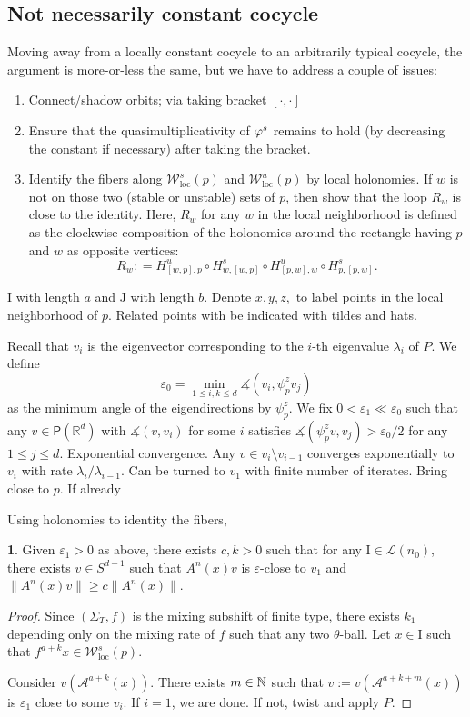 \documentclass[11pt,oneside,reqno]{amsart}
\numberwithin{equation}{section}
\numberwithin{figure}{section}
\theoremstyle{definition}
\theoremstyle{definition}
\theoremstyle{definition}
\theoremstyle{definition}
\newtheorem{lem}[thm]{\protect\lemmaname}
\theoremstyle{remark}
\theoremstyle{definition}
\theoremstyle{definition}
\theoremstyle{definition}
\def\A{\mathcal{A}}
\def\L{\mathcal{L}}
\def\P{\mathsf{P}}
\def\R{\mathbb{R}}
\def\I{\mathrm{I}}
\def\J{\mathrm{J}}
\def\PR{\P(\R^d)}
\def\vps{\vphi^s}
\def\ep{\varepsilon}
\def\mangle{\measuredangle}
\newcommand{\Wloc}{\mathcal{W}_{\text{loc}}}
\newcommand{\Sig}{\Sigma_T}
\providecommand{\lemmaname}{Lemma}
\begin{document}
\subsection{Not necessarily constant cocycle}
Moving away from a locally constant cocycle to an arbitrarily typical cocycle, the argument is more-or-less the same, but we have to address a couple of issues:
\begin{enumerate}
\item Connect/shadow orbits; via taking bracket $[\cdot, \cdot]$
\item Ensure that the quasimultiplicativity of $\vps$ remains to hold (by decreasing the constant if necessary) after taking the bracket. 
\item Identify the fibers along $\Wloc^s(p)$ and $\Wloc^u(p)$ by local holonomies. 
If $w$ is not on those two (stable or unstable) sets of $p$, then show that the loop $R_w$ is close to the identity. Here, $R_w$ for any $w$ in the local neighborhood is defined as the clockwise composition of the holonomies around the rectangle having $p$ and $w$ as opposite vertices:
$$R_w : = H^u_{[w,p],p}\circ H^s_{w,[w,p]}\circ H^u_{[p,w],w}\circ H^s_{p,[p,w]}.$$


\end{enumerate}












\newpage
$\I$ with length $a$ and $\J$ with length $b$. Denote $x,y,z,$ to label points in the local neighborhood of $p$. Related points with be indicated with tildes and hats.

Recall that $v_i$ is the eigenvector corresponding to the $i$-th eigenvalue $\lambda_i$ of $P$. We define $$\ep_0=\min\limits_{1\leq i,k\leq d} \mangle(v_i,\psi_p^zv_j)$$ as the minimum angle of the eigendirections by $\psi_p^z$. We fix $0<\ep_1 \ll \ep_0$ such that any $v \in \PR$ with $\mangle(v,v_i)$ for some $i$ satisfies $\mangle(\psi_p^zv,v_j) >\ep_0/2$ for any $1 \leq j \leq d$. Exponential convergence. Any $v \in v_i\setminus v_{i-1}$ converges exponentially to $v_{i}$ with rate $\lambda_i/\lambda_{i-1}$.
Can be turned to $v_1$ with finite number of iterates. Bring close to $p$. If already 

Using holonomies to identity the fibers, 

\begin{lem}
Given $\ep_1>0$ as above, there exists $c,k>0$ such that for any $\I \in \L(n_0)$, there exists $v \in S^{d-1}$ such that $A^n(x)v$ is $\ep$-close to $v_1$ and $\|A^n(x)v\| \geq c\|A^n(x)\|$. 
\end{lem}
\begin{proof} Since $(\Sig,f)$ is the mixing subshift of finite type, there exists $k_1$ depending only on the mixing rate of $f$ such that any two $\theta$-ball. Let $x \in \I$ such that $f^{a+k} x\in\Wloc^s(p)$. 

Consider $v(\A^{a+k}(x))$. There exists $m \in \mathbb{N}$ such that $v :=v(\A^{a+k+m}(x))$ is $\ep_1$ close to some $v_i$. If $i =1$, we are done. If not, twist and apply $P$.
\end{proof}
\end{document}
